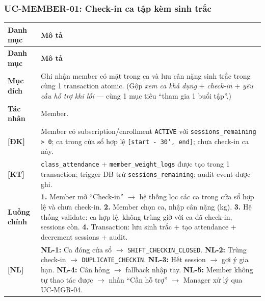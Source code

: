\subsubsection{UC-MEMBER-01: Check-in ca tập kèm sinh trắc}
\begingroup
\renewcommand{\arraystretch}{1.3}
\begin{longtable}{|>{\centering\arraybackslash}m{3cm}|>{\raggedright\arraybackslash}m{12cm}|}
\hline
\textbf{Danh mục} & \textbf{Mô tả} \\ \hline
\endfirsthead
\hline
\textbf{Danh mục} & \textbf{Mô tả} \\ \hline
\endhead
\hline
\endfoot
\textbf{Mục đích} & Ghi nhận member có mặt trong ca và lưu cân nặng sinh trắc trong cùng 1 transaction atomic. (Gộp \emph{xem ca khả dụng} + \emph{check-in} + \emph{yêu cầu hỗ trợ khi lỗi} — cùng 1 mục tiêu ``tham gia 1 buổi tập''.) \\
\hline
\textbf{Tác nhân} & Member. \\
\hline
\textbf{[ĐK]} & Member có subscription/enrollment \texttt{ACTIVE} với \texttt{sessions\_remaining > 0}; ca trong cửa sổ hợp lệ \texttt{[start - 30', end]}; chưa check-in ca này. \\
\hline
\textbf{[KT]} & \texttt{class\_attendance} + \texttt{member\_weight\_logs} được tạo trong 1 transaction; trigger DB trừ \texttt{sessions\_remaining}; audit event được ghi. \\
\hline
\textbf{Luồng chính} & \textbf{1.} Member mở ``Check-in'' $\rightarrow$ hệ thống lọc các ca trong cửa sổ hợp lệ và chưa check-in. \textbf{2.} Member chọn ca, nhập cân nặng (kg). \textbf{3.} Hệ thống validate: ca hợp lệ, không trùng giờ với ca đã check-in, sessions còn. \textbf{4.} Transaction: lưu sinh trắc + tạo attendance + decrement sessions + audit. \\
\hline
\textbf{[NL]} & \textbf{NL-1:} Ca đóng cửa sổ $\rightarrow$ \texttt{SHIFT\_CHECKIN\_CLOSED}. \textbf{NL-2:} Trùng check-in $\rightarrow$ \texttt{DUPLICATE\_CHECKIN}. \textbf{NL-3:} Hết session $\rightarrow$ gợi ý gia hạn. \textbf{NL-4:} Cân hỏng $\rightarrow$ fallback nhập tay. \textbf{NL-5:} Member không tự thao tác được $\rightarrow$ nhấn ``Cần hỗ trợ'' $\rightarrow$ Manager xử lý qua UC-MGR-04. \\
\hline
\end{longtable}
\endgroup

